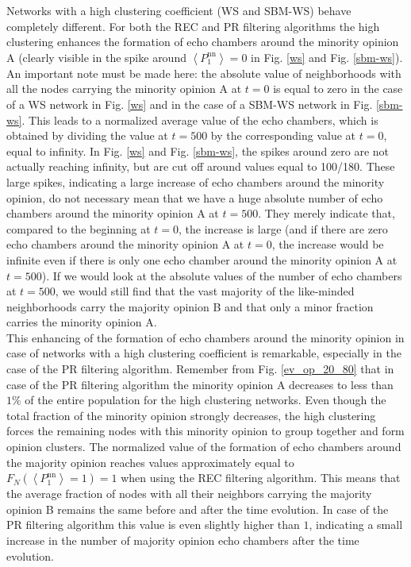 \documentclass[11 pt , letterpaper , twoside , openright]{book}
\begin{document}
Networks with a high clustering coefficient (WS and SBM-WS) behave completely different. For both the REC and PR filtering algorithms the high clustering enhances the formation of echo chambers around the minority opinion A (clearly visible in the spike around $\left<P_1^{\text{nn}}\right> = 0$ in Fig. \ref{ws} and Fig. \ref{sbm-ws}). An important note must be made here: the absolute value of neighborhoods with all the nodes carrying the minority opinion A at $t=0$ is equal to zero in the case of a WS network in Fig. \ref{ws} and in the case of a SBM-WS network in Fig. \ref{sbm-ws}. This leads to a normalized average value of the echo chambers, which is obtained by dividing the value at $t=500$ by the corresponding value at $t=0$, equal to infinity. In Fig. \ref{ws} and Fig. \ref{sbm-ws}, the spikes around zero are not actually reaching infinity, but are cut off around values equal to 100/180. These large spikes, indicating a large increase of echo chambers around the minority opinion, do not necessary mean that we have a huge absolute number of echo chambers around the minority opinion A at $t=500$. They merely indicate that, compared to the beginning at $t=0$, the increase is large (and if there are zero echo chambers around the minority opinion A at $t=0$, the increase would be infinite even if there is only one echo chamber around the minority opinion A at $t=500$). If we would look at the absolute values of the number of echo chambers at $t=500$, we would still find that the vast majority of the like-minded neighborhoods carry the majority opinion B and that only a minor fraction carries the minority opinion A.\\
\newline
This enhancing of the formation of echo chambers around the minority opinion in case of networks with a high clustering coefficient is remarkable, especially in the case of the PR filtering algorithm. Remember from Fig. \ref{ev_op_20_80} that in case of the PR filtering algorithm the minority opinion A decreases to less than $1 \%$ of the entire population for the high clustering networks. Even though the total fraction of the minority opinion strongly decreases, the high clustering forces the remaining nodes with this minority opinion to group together and form opinion clusters. The normalized value of the formation of echo chambers around the majority opinion reaches values approximately equal to $F_N(\left<P_1^{\text{nn}}\right> = 1) = 1$ when using the REC filtering algorithm. This means that the average fraction of nodes with all their neighbors carrying the majority opinion B remains the same before and after the time evolution. In case of the PR filtering algorithm this value is even slightly higher than $1$, indicating a small increase in the number of majority opinion echo chambers after the time evolution. 
\end{document}
